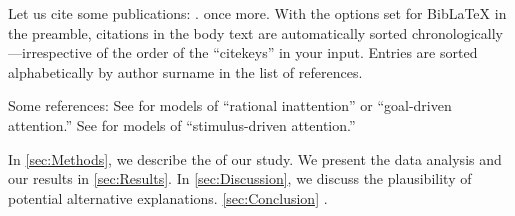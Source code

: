 Let us cite some publications: \cite{Andersen2008, Andreoni2012, Balakrishnan2016, Koszegi2013}. \cite{Andersen2008} once more. With the options set for BibLaTeX in the preamble, citations in the body text are automatically sorted chronologically---irrespective of the order of the ``citekeys'' in your input. Entries are sorted alphabetically by author surname in the list of references.

\Blindtext[3]

Some references: See \cite{Sims2003, Gabaix2014} for models of ``rational inattention'' or ``goal-driven attention.'' See \cite{Bordalo2012, Bordalo2013, Koszegi2013, Taubinsky2014, Bushong2016} for models of ``stimulus-driven attention.''%

\blindmathtrue

\Blindtext[3]

In \autoref{sec:Methods}, we describe the  of our study. We present the data analysis and our results in \autoref{sec:Results}. In \autoref{sec:Discussion}, we discuss the plausibility of potential alternative explanations. \autoref{sec:Conclusion} .